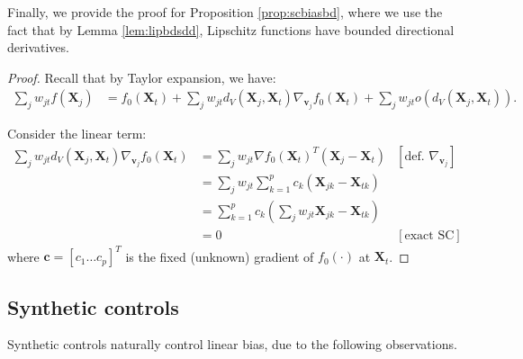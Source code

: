 \documentclass{article}
\newcommand{\Xt}{\mathbf{X}_t}
\newcommand{\Xj}{\mathbf{X}_j}
\newcommand{\vj}{\mathbf{v}_j}
\begin{document}
Finally, we provide the proof for Proposition \ref{prop:scbiasbd},
where we use the fact that by Lemma \ref{lem:lipbdsdd}, Lipschitz functions have bounded directional derivatives.
\begin{proof}
    Recall that by Taylor expansion, we have:
    \begin{align*}
        \sum_j w_{jt} f(\Xj)
        &= f_0(\Xt) + \sum_j w_{jt} d_V(\Xj, \Xt) \nabla_{\vj} f_0(\Xt) + \sum_j w_{jt} o(d_V(\Xj, \Xt)).
    \end{align*}
    
    Consider the linear term:
    \begin{align*}
        \sum_j w_{jt}  d_V(\Xj, \Xt) \nabla_{\vj} f_0(\Xt)
        &= \sum_j w_{jt} \nabla f_0(\Xt)^T (\Xj - \Xt) &[\text{def. } \nabla_{\vj}]\\
        &= \sum_j w_{jt} \sum_{k=1}^p c_k (\mathbf{X}_{jk} - \mathbf{X}_{tk}) \\
        &= \sum_{k=1}^p c_k (\sum_j w_{jt} \mathbf{X}_{jk} - \mathbf{X}_{tk}) \\
        &= 0 &[\text{exact SC}]
    \end{align*}
    where $\mathbf{c} = [c_1 \dots c_p]^T$ is the fixed (unknown) gradient of $f_0(\cdot)$ at $\Xt$.
\end{proof}


\subsection{Synthetic controls}
\label{app:scm}

Synthetic controls naturally control linear bias, due to the following observations.
\end{document}
